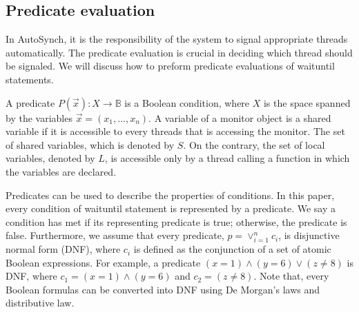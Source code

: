 \documentclass[preprint]{sigplanconf}
\begin{document}
\subsection{Predicate evaluation}
In AutoSynch, it is the responsibility of the system to signal appropriate 
threads automatically. The predicate evaluation is crucial in deciding which
thread should be signaled. We will discuss how to preform predicate evaluations
of waituntil statements. 

A predicate $P(\vec{x}): X \rightarrow \mathbb{B}$ is a Boolean condition, 
where $X$ is the space spanned by the variables $\vec{x}=(x_1, \dots, x_n)$. 
A variable of a monitor object is a shared variable if it is accessible to every 
threads that is accessing the monitor. The set of shared variables, which is denoted by 
$S$. On the contrary, the set of local variables, denoted by $L$, is 
accessible only by a thread calling a function in which the variables are declared. 

Predicates can be used to describe the properties of conditions. In this paper,
every condition of waituntil statement is represented by a predicate. We say
a condition has met if its representing predicate is true; otherwise, the
predicate is false. 
Furthermore, we assume that every predicate, $p = \vee_{i=1}^nc_i$, is 
disjunctive normal form (DNF), where $c_i$ is defined as the conjunction of a 
set of atomic Boolean expressions. For example, a predicate $(x = 1) \wedge 
(y = 6) \vee (z \ne 8)$ is DNF, where $c_1 = (x = 1) \wedge (y = 6)$ and $c_2 = 
(z \ne 8)$. Note that, every Boolean formulas can be converted into DNF using 
De Morgan's laws and distributive law. 
\end{document}
